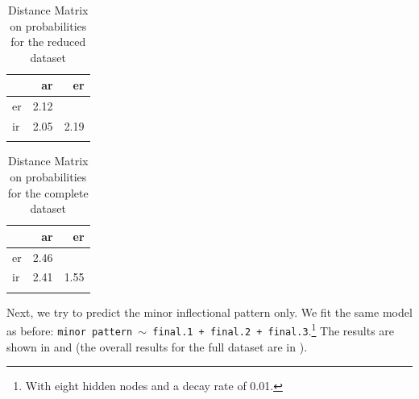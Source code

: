      

\begin{table}
    \caption{Distance Matrix on probabilities for the reduced dataset}
    \label{tab:spanish-verbs-theme-dist-prob}
    \begin{tabular}{lrr}
      \lsptoprule
      & ar   & er   \\
      \midrule
      er & 2.12 &      \\
      ir & 2.05 & 2.19 \\
      \lspbottomrule
    \end{tabular}

\end{table}

\begin{table}
    
    \caption{Distance Matrix on probabilities for the complete dataset}
    \label{tab:spanish-verbs-theme-dist-prob-2}
    \centering
    \begin{tabular}{lrr}
      \lsptoprule
      & ar   & er   \\
      \midrule
      er & 2.46 &      \\
      ir & 2.41 & 1.55 \\
      \lspbottomrule
    \end{tabular}


\end{table}


Next, we try to predict the minor inflectional pattern only. We fit the same model as before: \texttt{minor pattern $\sim$ final.1 + final.2 + final.3}.\footnote{With eight hidden nodes and a decay rate of 0.01.} The results are shown in  and  (the overall results for the full dataset are in ).

